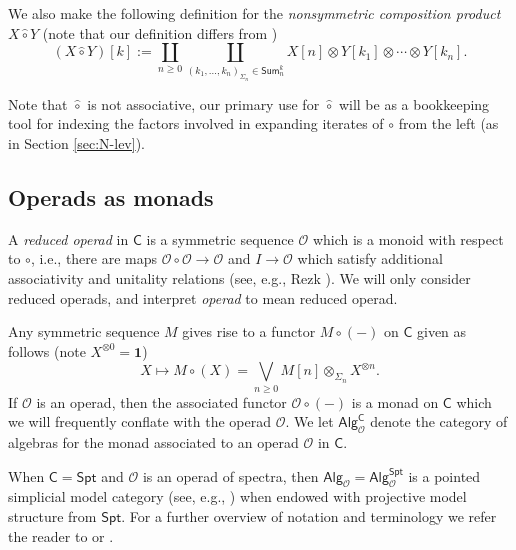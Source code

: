 \documentclass[11pt]{amsart}
\theoremstyle{definition}
\theoremstyle{remark}
\newcommand{\Spt}{\mathsf{Spt}}
\newcommand{\Alg}[1]{ {\mathsf{Alg}_{\mathcal{#1}}} }
\newcommand{\Cal}[1]{\mathcal{#1}}
\begin{document}
We also make the following definition for the \textit{nonsymmetric composition product} $X\hat{\circ} Y$ (note that our definition differs from \cite{Har-2}) \begin{equation}
\label{comp-prod-nonsym}
    (X\hat{\circ} Y)[k] := \coprod_{n\geq 0} \coprod_{(k_1,\dots,k_n)_{\Sigma_n}\in \mathsf{Sum}_n^k} X[n]\otimes Y[k_1]\otimes \cdots \otimes Y[k_n].
\end{equation}

Note that $\hat{\circ}$ is not associative, our primary use for $\hat{\circ}$ will be as a bookkeeping tool for indexing the factors involved in expanding iterates of $\circ$ from the left (as in Section \ref{sec:N-lev}).


\subsection{Operads as monads}
A \textit{reduced operad} in $\mathsf{C}$ is a  symmetric sequence $\Cal{O}$ which is a monoid with respect to $\circ$, i.e., there are maps $\Cal{O}\circ \Cal{O}\to \Cal{O}$ and $I\to \Cal{O}$ which satisfy additional associativity and unitality relations (see, e.g.,  Rezk \cite{Rezk-thesis}). We will only consider reduced operads, and interpret \textit{operad} to mean reduced operad.

Any symmetric sequence $M$ gives rise to a functor $M\circ (-)$ on $\mathsf{C}$ given as follows (note $X^{\otimes 0}=\mathbf{1}$) \[ X\mapsto M\circ (X) = \bigvee_{n\geq 0} M[n] \otimes_{\Sigma_n} X^{\otimes n}. \] If $\Cal{O}$ is an operad, then the associated functor $\Cal{O}\circ(-)$ is a monad on $\mathsf{C}$ which we will frequently conflate with the operad $\Cal{O}$. We let $\mathsf{Alg}_{\Cal{O}}^{\mathsf{C}}$ denote the category of algebras for the monad associated to an operad $\Cal{O}$ in $\mathsf{C}$. 

When $\mathsf{C}=\Spt$ and $\Cal{O}$ is an operad of spectra, then $\Alg{O}=\mathsf{Alg}_{\Cal{O}}^{\Spt}$ is a pointed simplicial model category (see, e.g.,  \cite[]{Ching-Harper-Koszul}) when endowed with projective model structure from $\Spt$. For a further overview of notation and terminology we refer the reader to \cite[]{Har-1} or \cite[]{Rezk-thesis}. 

\end{document}
